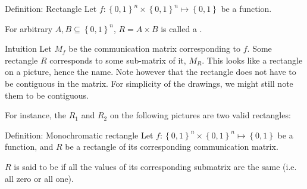 \documentclass[a4paper]{article}
\begin{document}
\begin{parag}{Definition: Rectangle}
    Let $f : \left\{0, 1\right\}^n \times \left\{0, 1\right\}^n \mapsto \left\{0, 1\right\}$ be a function. 

    For arbitrary $A, B \subseteq \left\{0, 1\right\}^n$, $R = A \times B$ is called a .

    \begin{subparag}{Intuition}
        Let $M_f$ be the communication matrix corresponding to $f$. Some rectangle $R$ corresponds to some sub-matrix of it, $M_R$. This looks like a rectangle on a picture, hence the name. Note however that the rectangle does not have to be contiguous in the matrix. For simplicity of the drawings, we might still note them to be contiguous.

        For instance, the $R_1$ and $R_2$ on the following pictures are two valid rectangles:
    \end{subparag}
\end{parag}

\begin{parag}{Definition: Monochromatic rectangle}
    Let $f : \left\{0, 1\right\}^n \times \left\{0, 1\right\}^n \mapsto \left\{0, 1\right\}$ be a function, and $R$ be a rectangle of its corresponding communication matrix. 

    $R$ is said to be  if all the values of its corresponding submatrix are the same (i.e. all zero or all one).
\end{parag}
\end{document}
